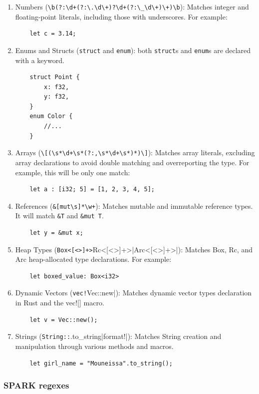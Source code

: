 \documentclass[nomenclature, english, bibtex]{kththesis}
\begin{document}
\begin{enumerate}
    \item Numbers (\verb|\b(?:\d+(?:\.\d\+)?\d+(?:\_\d\+)\+)\b|): Matches integer and floating-point literals, including those with underscores. For example:
    \begin{verbatim}
    let c = 3.14;
    \end{verbatim}
    \item Enums and Structs (\verb|struct| and \verb|enum|): both \texttt{struct}s and \texttt{enum}s are declared with a keyword. 
    \begin{verbatim}
    struct Point {
        x: f32,
        y: f32,
    }
    enum Color {
        //...
    }
    \end{verbatim}
    \item Arrays (\verb|\[(\s*\d+\s*(?:,\s*\d+\s*)*)\]|): Matches array literals, excluding array declarations to avoid double matching and overreporting the type. For example, this will be only one match:
    \begin{verbatim}
    let a : [i32; 5] = [1, 2, 3, 4, 5];  
    \end{verbatim}
    \item References (\verb|&[mut\s]*\w+|): Matches mutable and immutable reference types. It will match \texttt{\&T} and \texttt{\&mut T}.
    \begin{verbatim}
    let y = &mut x;  
    \end{verbatim}
    \item Heap Types (\verb|Box<[<>]+>|Rc<[<>]+>|Arc<[<>]+>|): Matches Box, Rc, and Arc heap-allocated type declarations. For example:
    \begin{verbatim}
    let boxed_value: Box<i32>
    \end{verbatim}
    \item Dynamic Vectors (\verb|vec!|Vec::new|): Matches dynamic vector types declaration in Rust and the vec![] macro.
    \begin{verbatim}
    let v = Vec::new();
    \end{verbatim}
    \item Strings (\verb|String::|.to\_string|format!|): Matches String creation and manipulation through various methods and macros.
    \begin{verbatim}
    let girl_name = "Mouneissa".to_string();
    \end{verbatim}
\end{enumerate}
 
\subsubsection{SPARK regexes}
\end{document}
